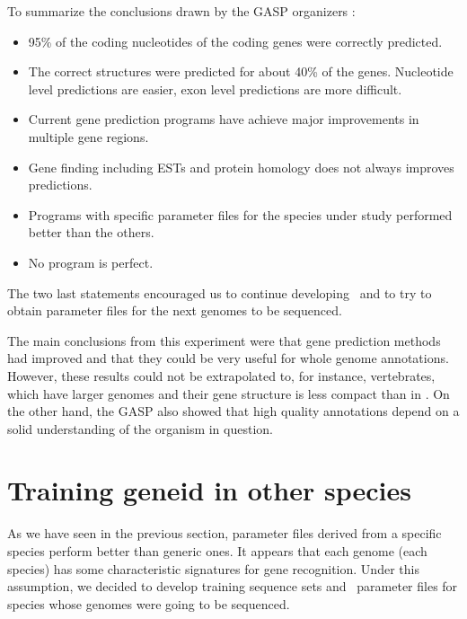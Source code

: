 To summarize the conclusions drawn by the GASP organizers  
\citep{reese:2000a}:

\begin{itemize}
\item 95\% of the coding nucleotides of the coding genes were
correctly predicted.

\item The correct structures were predicted for about 40\% of the
genes. Nucleotide level predictions are easier, exon level predictions are
more difficult.

\item Current gene prediction programs have achieve major improvements 
in multiple gene regions.

\item Gene finding including ESTs and protein homology does not always
improves predictions.

\item Programs with specific parameter files for the species under study
performed better than the others.

\item No program is perfect.

\end{itemize}

The two last statements encouraged us to continue developing
\geneid\ and to try to obtain parameter files for the next genomes to
be sequenced.

The main conclusions from this experiment were that gene prediction
methods had improved and that they could be very useful for whole
genome annotations. However, these results could not be extrapolated
to, for instance, vertebrates, which have larger genomes and their
gene structure is less compact than in \Dm. On the other hand, the
GASP also showed that high quality annotations depend on a solid
understanding of the organism in question.





\section{Training geneid in other species}

As we have seen in the previous section, parameter files derived from
a specific species perform better than generic ones. It appears that
each genome (each species) has some characteristic signatures for gene
recognition. Under this assumption, we decided to develop training
sequence sets and \geneid\ parameter files for species whose genomes
were going to be sequenced.


